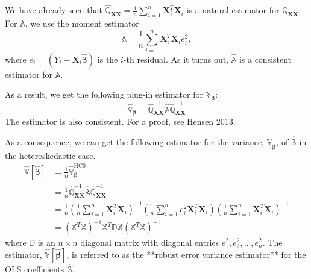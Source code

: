 \documentclass[12pt, block=fill]{beamer}
\renewcommand{\v}[1]{\boldsymbol{#1}}
\newcommand{\m}[1]{\mathbb{#1}}
\begin{document}
We have already seen that $\widehat{\m{Q}}_{\v{XX}}=\frac{1}{n}\sum\limits_{i=1}^n\v{X}_i^T\v{X}_i$ is a natural estimator for $\m{Q}_{\v{XX}}$. For $\m{A}$, we use the moment estimator
$$
\widehat{\m{A}}=\frac{1}{n}\sum\limits_{i=1}^n\v{X}_i^T\v{X}_ie_i^2,
$$
where $e_i=(Y_i-\v{X}_i\widehat{\v{\beta}})$ is the $i$-th residual. As it turns out, $\widehat{\m{A}}$ is a consistent estimator
for $\m{A}$.


As a result, we get the following plug-in estimator for $\m{V}_{\v{\beta}}$:
$$
\widehat{\m{V}}_{\v{\beta}}=
\widehat{\m{Q}}_{\v{XX}}^{-1}\widehat{\m{A}}\widehat{\m{Q}}_{\v{XX}}^{-1}
$$
The estimator is also consistent. For a proof, see Hensen 2013.

As a consequence, we can get the following estimator for the variance, $\m{V}_{\widehat{\v{\beta}}}$, of $\widehat{\v{\beta}}$ in the heteroskedastic case.
$$
\begin{aligned}
\widehat{\m{V}}\left[\widehat{\v{\beta}}\right]
&=\frac{1}{n}\widehat{\m{V}}_{\v{\beta}}^{\text{HC0}} \\
&=\frac{1}{n}\widehat{\m{Q}}_{\v{XX}}^{-1}\widehat{\m{A}}\widehat{\m{Q}}_{\v{XX}}^{-1} \\
&=\frac{1}{n}\left(\frac{1}{n}\sum\limits_{i=1}^n\v{X}_i^T\v{X}_i\right)^{-1}
\left(\frac{1}{n}\sum\limits_{i=1}^ne_i^2\v{X}_i^T\v{X}_i\right)
\left(\frac{1}{n}\sum\limits_{i=1}^n\v{X}_i^T\v{X}_i\right)^{-1} \\
&=\left(\m{X}^T\m{X}\right)^{-1}
\m{X}^T\m{D}\m{X}
\left(\m{X}^T\m{X}\right)^{-1}
\end{aligned}
$$
where $\m{D}$ is an $n\times n$ diagonal matrix with diagonal entries $e_1^2,e_2^2,\ldots,e_n^2$.
The estimator, $\widehat{\m{V}}\left[\widehat{\v{\beta}}\right]$, is referred to as the **robust error variance estimator** for the OLS coefficients $\widehat{\v{\beta}}$.

\end{document}
